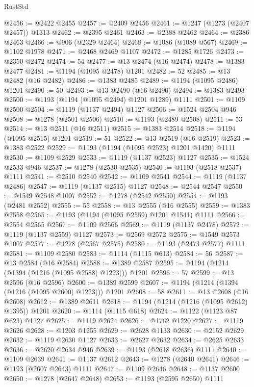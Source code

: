 \begin{lexlean}{RustStd}
\begin{coremodule}
{\begin{coremodule}
{{{{{{{{{{{{{{{{{{{{{{{{{{{{{{{@2456 := @2422 @2455
@2457 := @2409 @2456
@2461 := @1247 (@1273 (@2407 @2457)) @1313
@2462 := @2395 @2461
@2463 := @2388 @2462
@2464 := @2386 @2463
@2466 := @906 (@2329 @2464)
@2468 := @1086 (@1089 @567)
@2469 := @1102 @1978
@2471 := @2468 @2469 @1107
@2472 := @1285 @1726
@2473 := @2350 @2472
@2474 := 54
@2477 := @13 @2474 (@16 @2474)
@2478 := @1383 @2477
@2481 := @1194 (@1095 @2478) @1201
@2482 := 52
@2485 := @13 @2482 (@16 @2482)
@2486 := @1383 @2485
@2489 := @1194 (@1095 @2486) @1201
@2490 := 50
@2493 := @13 @2490 (@16 @2490)
@2494 := @1383 @2493
@2500 := @1193 (@1194 (@1095 @2494) @1201 @1289) @1111
@2501 := @1109 @2500
@2504 := @1119 (@1137 @2494) @1127
@2506 := @1524 @2504 @946
@2508 := @1278 (@2501 @2506)
@2510 := @1193 (@2489 @2508)
@2511 := 53
@2514 := @13 @2511 (@16 @2511)
@2515 := @1383 @2514
@2518 := @1194 (@1095 @2515) @1201
@2519 := 51
@2522 := @13 @2519 (@16 @2519)
@2523 := @1383 @2522
@2529 := @1193 (@1194 (@1095 @2523) @1201 @1420) @1111
@2530 := @1109 @2529
@2533 := @1119 (@1137 @2523) @1127
@2535 := @1524 @2533 @946
@2537 := @1278 (@2530 @2535)
@2540 := @1193 (@2518 @2537) @1111
@2541 := @2510 @2540
@2542 := @1109 @2541
@2544 := @1119 (@1137 @2486)
@2547 := @1119 (@1137 @2515) @1127
@2548 := @2544 @2547
@2550 := @1549 @2548 @1007
@2552 := @1278 (@2542 @2550)
@2554 := @1193 (@2481 @2552)
@2555 := 55
@2558 := @13 @2555 (@16 @2555)
@2559 := @1383 @2558
@2565 := @1193 (@1194 (@1095 @2559) @1201 @1541) @1111
@2566 := @2554 @2565
@2567 := @1109 @2566
@2569 := @1119 (@1137 @2478)
@2572 := @1119 (@1137 @2559) @1127
@2573 := @2569 @2572
@2575 := @1549 @2573 @1007
@2577 := @1278 (@2567 @2575)
@2580 := @1193 (@2473 @2577) @1111
@2581 := @1109 @2580
@2583 := @1114 (@1115 @613)
@2584 := 56
@2587 := @13 @2584 (@16 @2584)
@2588 := @1389 @2587
@2595 := @1194 (@1214 (@1394 (@1216 (@1095 @2588) @1223))) @1201
@2596 := 57
@2599 := @13 @2596 (@16 @2596)
@2600 := @1389 @2599
@2607 := @1194 (@1214 (@1394 (@1216 (@1095 @2600) @1223))) @1201
@2608 := 58
@2611 := @13 @2608 (@16 @2608)
@2612 := @1389 @2611
@2618 := @1194 (@1214 (@1216 (@1095 @2612) @1395)) @1201
@2620 := @1114 (@1115 @618)
@2624 := @1122 (@1123 @87 @623) @1127
@2625 := @1119 @2624
@2626 := @1762 @1220
@2627 := @1119 @2626
@2628 := @1203 @1255
@2629 := @2628 @1133
@2630 := @2152 @2629
@2632 := @1119 @2630 @1127
@2633 := @2627 @2632
@2634 := @2625 @2633
@2636 := @2620 @2634 @946
@2639 := @1193 (@2618 @2636) @1111
@2640 := @1109 @2639
@2641 := @1137 @2612
@2643 := @1278 (@2640 @2641)
@2646 := @1193 (@2607 @2643) @1111
@2647 := @1109 @2646
@2648 := @1137 @2600
@2650 := @1278 (@2647 @2648)
@2653 := @1193 (@2595 @2650) @1111
}}}}}}}}}}}}}}}}}}}}}}}}}}}}}}}
\end{coremodule}}
\end{coremodule}
\end{lexlean}
